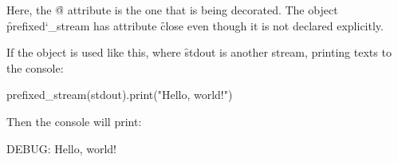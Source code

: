 Here, the \f{@} attribute is the one that is being decorated.
The object \f{prefixed\char`_stream} has attribute \f{close} even
though it is not declared explicitly.

If the object is used like this, where \f{stdout} is another stream,
printing texts to the console:

\begin{eocode}
prefixed_stream(stdout).print("Hello, world!")
\end{eocode}

Then the console will print:

\begin{eocode}
DEBUG: Hello, world!
\end{eocode}

